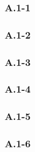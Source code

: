 \subsubsection*{A.1-1}


\subsubsection*{A.1-2}


\subsubsection*{A.1-3}


\subsubsection*{A.1-4}


\subsubsection*{A.1-5}


\subsubsection*{A.1-6}


